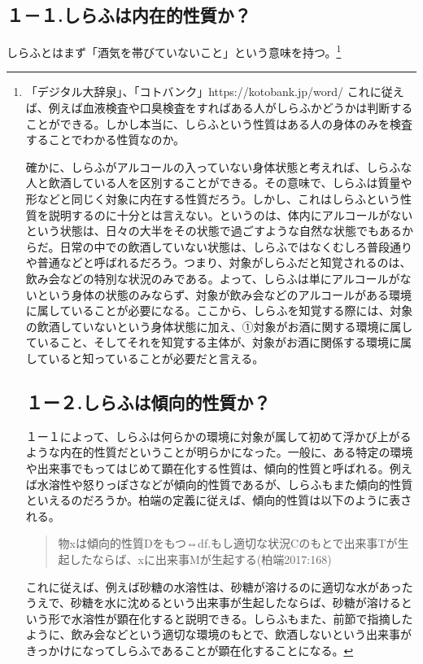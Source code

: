 \documentclass[b5j,twoside,twocolumn]{utarticle}
\begin{document}
\subsection{１－１.しらふは内在的性質か？}
しらふとはまず「酒気を帯びていないこと」という意味を持つ。\footnote{「デジタル大辞泉」、「コトバンク」https://kotobank.jp/word/%
これに従えば、例えば血液検査や口臭検査をすればある人がしらふかどうかは判断することができる。しかし本当に、しらふという性質はある人の身体のみを検査することでわかる性質なのか。

確かに、しらふがアルコールの入っていない身体状態と考えれば、しらふな人と飲酒している人を区別することができる。その意味で、しらふは質量や形などと同じく対象に内在する性質だろう。しかし、これはしらふという性質を説明するのに十分とは言えない。というのは、体内にアルコールがないという状態は、日々の大半をその状態で過ごすような自然な状態でもあるからだ。日常の中での飲酒していない状態は、しらふではなくむしろ普段通りや普通などと呼ばれるだろう。つまり、対象がしらふだと知覚されるのは、飲み会などの特別な状況のみである。よって、しらふは単にアルコールがないという身体の状態のみならず、対象が飲み会などのアルコールがある環境に属していることが必要になる。ここから、しらふを知覚する際には、対象の飲酒していないという身体状態に加え、①対象がお酒に関する環境に属していること、そしてそれを知覚する主体が、対象がお酒に関係する環境に属していると知っていることが必要だと言える。

\subsection{１ー２.しらふは傾向的性質か？}

１ー１によって、しらふは何らかの環境に対象が属して初めて浮かび上がるような内在的性質だということが明らかになった。一般に、ある特定の環境や出来事でもってはじめて顕在化する性質は、傾向的性質と呼ばれる。例えば水溶性や怒りっぽさなどが傾向的性質であるが、しらふもまた傾向的性質といえるのだろうか。柏端の定義に従えば、傾向的性質は以下のように表される。

\begin{quote}
物xは傾向的性質Dをもつ⇔df.もし適切な状況Cのもとで出来事Tが生起したならば、xに出来事Mが生起する(柏端2017:168)
\end{quote}

これに従えば、例えば砂糖の水溶性は、砂糖が溶けるのに適切な水があったうえで、砂糖を水に沈めるという出来事が生起したならば、砂糖が溶けるという形で水溶性が顕在化すると説明できる。しらふもまた、前節で指摘したように、飲み会などという適切な環境のもとで、飲酒しないという出来事がきっかけになってしらふであることが顕在化することになる。

}
\end{document}
